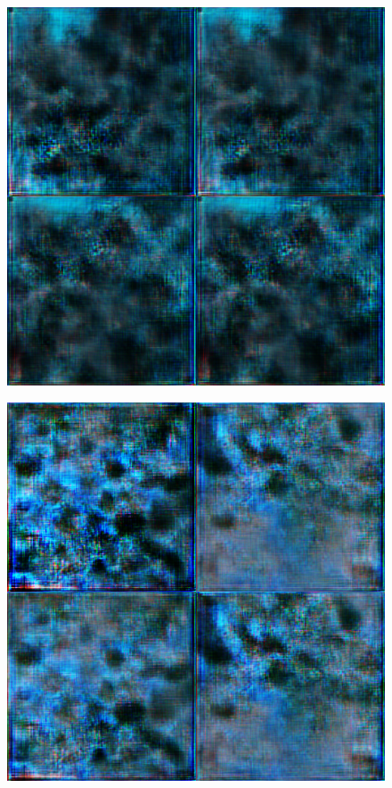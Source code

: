 \begin{figure}[H]
\begin{minipage}{0.24\columnwidth}
		\label{fig:}
	\end{minipage}
	\begin{minipage}{0.24\columnwidth}
		\centering
		\includegraphics[clip, width=\linewidth]{fig/generative_adversarial_nets/1213_0000}
		\label{fig:}
	\end{minipage}
	\begin{minipage}{0.24\columnwidth}
		\centering
		\includegraphics[clip, width=\linewidth]{fig/generative_adversarial_nets/1619_0000}

\end{minipage}
\end{figure}

